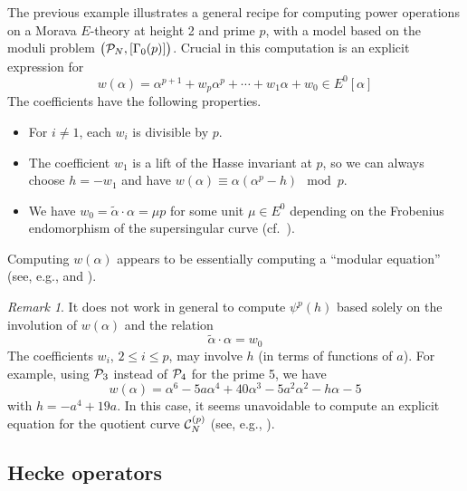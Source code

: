 \documentclass{gtpart}
\theoremstyle{definition}
\theoremstyle{remark}
\newtheorem{rmk}[thm]{Remark}
\newcommand{\CC}{{\cal C}}
\newcommand{\CP}{{\cal P}}
\newcommand{\A}{\alpha}
\newcommand{\G}{\Gamma}
\renewcommand{\=}{\approx}
\renewcommand{\-}{\sim}
\numberwithin{equation}{section}
\numberwithin{thm}{section}
\begin{document}
The previous example illustrates a general recipe for computing power operations on a Morava $E$-theory at height 2 and prime $p$, 
with a model based on the moduli problem $\big(\CP_N,[\G_0(p)]\big)$.  
Crucial in this computation is an explicit expression for 
\begin{equation}
 \label{generalw}
 w(\A) = \A^{p + 1} + w_p \A^p + \cdots + w_1 \A + w_0 \in E^0[\A] 
\end{equation}
The coefficients have the following properties.  
\begin{itemize}
 \item For $i \neq 1$, each $w_i$ is divisible by $p$.  

 \item The coefficient $w_1$ is a lift of the Hasse invariant at $p$, 
 so we can always choose $h = -w_1$ and have $w(\A) \equiv \A (\A^p - h) \mod p$.  

 \item We have $w_0 = \widetilde{\A} \cdot \A = \mu p$ for some unit $\mu \in E^0$ depending on the Frobenius endomorphism of the supersingular curve 
 (cf.~\cite[3.8]{mc1}).  
\end{itemize}
Computing $w(\A)$ appears to be essentially computing a ``modular equation'' (see, e.g., \cite[II.6]{Milne} and \cite{MO}).  

\begin{rmk}
 \label{rmk:invl}
 It does not work in general to compute $\psi^p(h)$ based solely on the involution of $w(\A)$ and the relation 
 \begin{equation}
  \label{w0}
  \widetilde{\A} \cdot \A = w_0 
 \end{equation}
 The coefficients $w_i$, $2 \leq i \leq p$, may involve $h$ (in terms of functions of $a$).  
 For example, using $\CP_3$ instead of $\CP_4$ for the prime 5, we have 
 \[
  w(\A) = \A^6 - 5 a \A^4 + 40 \A^3 - 5 a^2 \A^2 - h \A - 5 
 \]
 with $h = -a^4 + 19 a$.  
 In this case, it seems unavoidable to compute an explicit equation for the quotient curve $\CC_N^{(p)}$ 
 (see, e.g., \cite[proof of Proposition 2.3]{p3}).  
\end{rmk}



\subsection{Hecke operators}
\label{subsec:ho}
\end{document}
